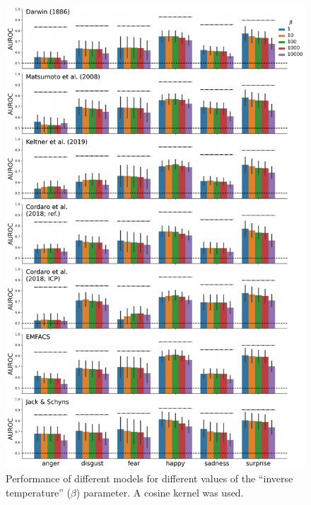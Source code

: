 \documentclass[12pt,american,a4paper,oneside,]{memoir} %
\begin{document}
\begin{figure}
\centering
\includegraphics{_bookdown_files/hypothesis-kernel-analysis-files/figures/figure_S2.pdf}
\caption{\label{fig:fig-hka-S2}Performance of different models for different values of the ``inverse temperature'' (\(\beta\)) parameter. A cosine kernel was used.}
\end{figure}
\end{document}
